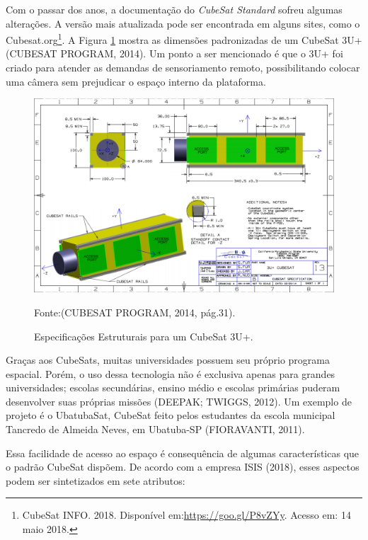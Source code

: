 Com o passar dos anos, a documentação do \textit{CubeSat Standard} sofreu algumas alterações. A versão mais atualizada pode ser encontrada em alguns sites, como o Cubesat.org\footnote{CubeSat INFO. 2018. Disponível em:\url{https://goo.gl/P8vZYy}. Acesso em: 14 maio 2018.}. A Figura \ref{fig05} mostra as dimensões padronizadas de um CubeSat 3U+ (CUBESAT PROGRAM, 2014). Um ponto a ser mencionado é que o 3U+ foi criado para atender as demandas de sensoriamento remoto, possibilitando colocar uma câmera sem prejudicar o espaço interno da plataforma.

{\small
\begin{figure}[h]
	\centering
    \caption{Especificações Estruturais para um CubeSat 3U+.}
	\includegraphics[keepaspectratio=true,scale=0.55]{figuras/cubesat3u+.PNG}
	
	Fonte:(CUBESAT PROGRAM, 2014, pág.31).
	\label{fig05}
\end{figure}
}

Graças aos CubeSats, muitas universidades possuem seu próprio programa espacial. Porém, o uso dessa tecnologia não é exclusiva apenas para grandes universidades; escolas secundárias, ensino médio e escolas primárias puderam desenvolver suas próprias missões (DEEPAK; TWIGGS, 2012). Um exemplo de projeto é o UbatubaSat, CubeSat feito pelos estudantes da escola municipal Tancredo de Almeida Neves, em Ubatuba-SP (FIORAVANTI, 2011).

Essa facilidade de acesso ao espaço é consequência de algumas características que o padrão CubeSat dispõem. De acordo com a empresa ISIS (2018), esses aspectos podem ser sintetizados em sete atributos:

